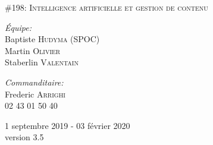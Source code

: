 \begin{titlepage}
\begin{center}
\vspace{0.4cm}
\textsc {\large \#198: Intelligence artificielle et gestion de contenu }\\[1.5cm]

\vspace{7cm}

\begin{minipage}{0.4\textwidth}
\begin{flushleft} \large
	\emph{Équipe:}\\
	Baptiste \textsc{Hudyma} (SPOC)\\
	Martin \textsc{Olivier}\\
	Staberlin \textsc{Valentain}
\end{flushleft}
\end{minipage}
\begin{minipage}{0.5\textwidth}
\begin{flushright} \large
	\emph{Commanditaire:}\\
	Frederic \textsc{Arrighi}\\
	02 43 01 50 40
\end{flushright}
\end{minipage}

\vfill

{\large 1\ier{} septembre 2019 - 03 février 2020}\\
{version 3.5}

\end{center}
\end{titlepage}
